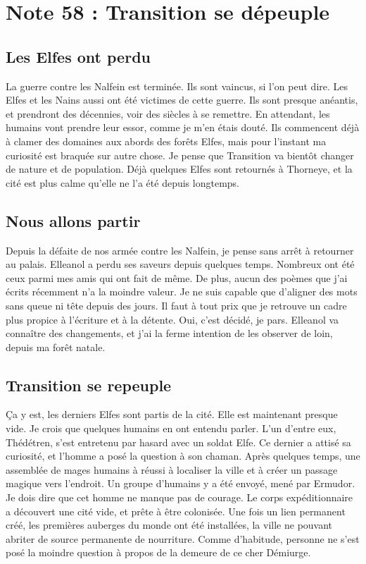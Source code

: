 \section{Note 58 : Transition se dépeuple}
\subsection{Les Elfes ont perdu}
La guerre contre les Nalfein est terminée. Ils sont vaincus, si l'on peut dire. Les Elfes et les Nains aussi ont été victimes de cette guerre. Ils sont presque anéantis, et prendront des décennies, voir des siècles à se remettre. En attendant, les humains vont prendre leur essor, comme je m'en étais douté. Ils commencent déjà à clamer des domaines aux abords des forêts Elfes, mais pour l'instant ma curiosité est braquée sur autre chose. Je pense que Transition va bientôt changer de nature et de population. Déjà quelques Elfes sont retournés à Thorneye, et la cité est plus calme qu'elle ne l'a été depuis longtemps.
\subsection{Nous allons partir}
Depuis la défaite de nos armée contre les Nalfein, je pense sans arrêt à retourner au palais. Elleanol a perdu ses saveurs depuis quelques temps. Nombreux ont été ceux parmi mes amis qui ont fait de même. De plus, aucun des poèmes que j'ai écrits récemment n'a la moindre valeur. Je ne suis capable que d'aligner des mots sans queue ni tête depuis des jours. Il faut à tout prix que je retrouve un cadre plus propice à l'écriture et à la détente. Oui, c'est décidé, je pars. Elleanol va connaître des changements, et j'ai la ferme intention de les observer de loin, depuis ma forêt natale.
\subsection{Transition se repeuple}
Ça y est, les derniers Elfes sont partis de la cité. Elle est maintenant presque vide. Je crois que quelques humains en ont entendu parler. L'un d'entre eux, Thédétren, s'est entretenu par hasard avec un soldat Elfe. Ce dernier a attisé sa curiosité, et l'homme a posé la question à son chaman. Après quelques temps, une assemblée de mages humains à réussi à localiser la ville et à créer un passage magique vers l'endroit. Un groupe d'humains y a été envoyé, mené par Ermudor. Je dois dire que cet homme ne manque pas de courage. Le corps expéditionnaire a découvert une cité vide, et prête à être colonisée. Une fois un lien permanent créé, les premières auberges du monde ont été installées, la ville ne pouvant abriter de source permanente de nourriture. Comme d'habitude, personne ne s'est posé la moindre question à propos de la demeure de ce cher Démiurge.
